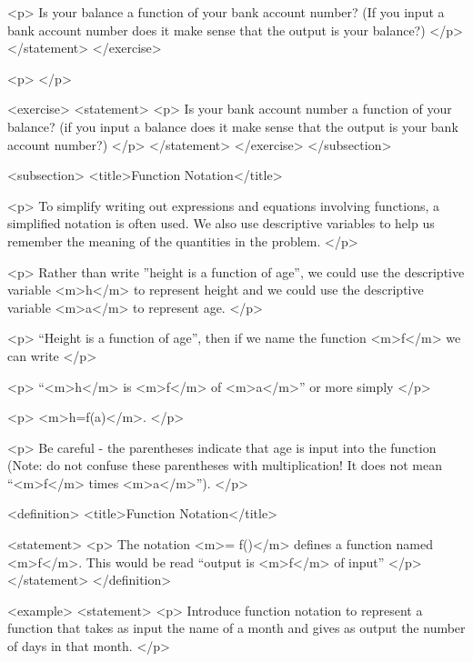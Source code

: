                 <p>
                    Is your balance a function of your bank account number? (If you input a bank account number does it make sense that the output is your balance?)
                </p>
            </statement>
        </exercise>

        <p>
        </p>

        <exercise>
            <statement>
                <p>
                    Is your bank account number a function of your balance? (if you input a balance does it make sense that the output is your bank account number?)
                </p>
            </statement>
        </exercise>
    </subsection>


    <subsection>
        <title>Function Notation</title>

        <p>
            To simplify writing out expressions and equations involving functions, a simplified notation is often used.
            We also use descriptive variables to help us remember the meaning of the quantities in the problem.
        </p>

        <p>
            Rather than write ”height is a function of age”, we could use the descriptive variable <m>h</m> to represent height and we could use the descriptive variable <m>a</m> to represent age.
        </p>

        <p>
            “Height is a function of age”, then if we name the function <m>f</m> we can write
        </p>

        <p>
            “<m>h</m> is <m>f</m> of <m>a</m>” or more simply
        </p>

        <p>
            <m>h=f(a)</m>.
        </p>

        <p>
            Be careful - the parentheses indicate that age is input into the function (Note: do not confuse these parentheses with multiplication! It does not mean “<m>f</m> times <m>a</m>”).
        </p>

        <definition>
            <title>Function Notation</title>

            <statement>
                <p>
                    The notation <m>= f()</m> defines a function named <m>f</m>.
                    This would be read “output is <m>f</m> of input”
                </p>
            </statement>
        </definition>

        <example>
            <statement>
                <p>
                    Introduce function notation to represent a function that takes as input the name of a month and gives as output the number of days in that month.
                </p>


